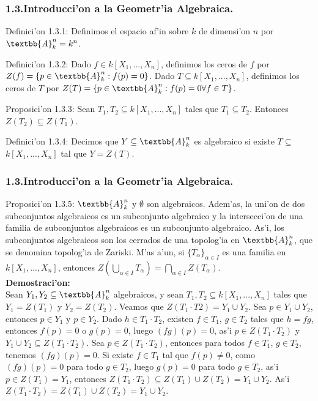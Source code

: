 \documentclass[10pt]{beamer}
\renewcommand{\A}{\textbb{A}_{k}^n}
\renewcommand{\a}{\alpha}
\begin{document}
\begin{frame}
\frametitle{1.3.Introducci'on a la Geometr'ia Algebraica.}
\begin{block}{Definici'on 1.3.1:} 
Definimos el espacio af'in sobre $k$ de dimensi'on $n$ por $\textbb{A}_{k}^n =k^n$.\\
\end{block}
\begin{block}{Definici'on 1.3.2:}
Dado $f \in k[X_1,...,X_n]$, definimos los ceros de $f$ por $Z(f)=\{p \in \textbb{A}_{k}^n:f(p)=0\}$. Dado $T \subseteq k[X_1,...,X_n]$, definimos los ceros de $T$ por $Z(T)=\{p \in \textbb{A}_{k}^n:f(p)=0  \forall f \in T \}$.\\
\end{block}
\begin{block}{Proposici'on 1.3.3:}
Sean $T_1,T_2 \subseteq k[X_1,...,X_n]$ tales que $T_1 \subseteq T_2$. Entonces $Z(T_2)\subseteq Z(T_1)$.\\
\end{block}
\begin{block}{Definici'on 1.3.4:}
Decimos que $Y \subseteq \textbb{A}_{k}^n$ es algebraico si existe $T \subseteq$\\ 
$k[X_1,...,X_n]$ tal que $Y=Z(T)$.\\
\end{block}
\end{frame}



\begin{frame}
\frametitle{1.3.Introducci'on a la Geometr'ia Algebraica.}
\begin{block}{Proposici'on 1.3.5:}
$\textbb{A}_{k}^n$ y $\emptyset$ son algebraicos. Adem'as, la uni'on de dos subconjuntos algebraicos es un subconjunto algebraico y la intersecci'on de una familia de subconjuntos algebraicos es un subconjunto algebraico. As'i, los subconjuntos algebraicos son los cerrados de una topolog'ia en $\textbb{A}_{k}^n$, que se denomina topolog'ia de Zariski. M'as a'un, si $\{T_{\a} \}_{\a \in I}$ es una familia en $k[X_1,...,X_n]$, entonces $Z(\bigcup _{\a \in I}{T_{\a}})=\bigcap _{\a \in I}{Z(T_{\a})}$.\\
\textbf{Demostraci'on:}\\
Sean $Y_1,Y_2 \subseteq \A$ algebraicos, y sean $T_1,T_2 \subseteq k[X_1,...,X_n]$ tales que $Y_1=Z(T_1)$ y $Y_2=Z(T_2)$. Veamos que $Z(T_1 \cdot T2)=Y_1 \cup Y_2$. Sea $p \in Y_1 \cup Y_2$, entonces $p \in Y_1$ y $p \in Y_2$. Dado $h \in T_1 \cdot T_2$, existen $f \in T_1$, $g \in T_2$ tales que $h=fg$, entonces $f(p)=0$ o $g(p)=0$, luego $(fg)(p)=0$, as'i $p \in Z(T_1 \cdot T_2)$ y $Y_1 \cup Y_2 \subseteq Z(T_1 \cdot T_2)$. Sea $p \in Z(T_1 \cdot T_2)$, entonces para todos $f \in T_1$, $g \in T_2$, tenemos $(fg)(p)=0$. Si existe $f \in T_1$ tal que $f(p) \not = 0$, como $(fg)(p)=0$ para todo $g \in T_2$, luego $g(p)=0$ para todo $g \in T_2$, as'i $p \in Z(T_1)=Y_1$, entonces $Z(T_1 \cdot T_2)\subseteq Z(T_1) \cup Z(T_2)=Y_1 \cup Y_2$. As'i $Z(T_1 \cdot T_2)=Z(T_1) \cup Z(T_2)=Y_1 \cup Y_2$.\\ 
\end{block}
\end{frame}
\end{document}

